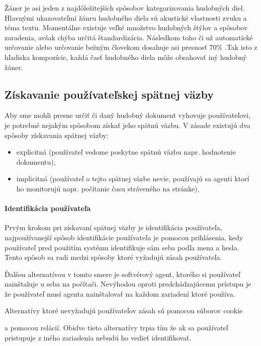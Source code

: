 Žáner je asi jeden z najdôležitejších spôsobov kategorizovania hudobných diel. Hlavnými ukazovateľmi žánru hudobného diela sú akustické vlastnosti zvuku a téma textu. Momentálne existuje veľké množstvo hudobných štýlov a spôsobov zaradenia, avšak chýba určitá štandardizácia. Následkom toho či už automatické určovanie alebo určovanie bežným človekom dosahuje asi presnosť 70\% \cite{5}.Tak isto z hľadiska kompozície, každá časť hudobného diela môže obsahovať iný hudobný žáner\cite{3}.

\subsection{Získavanie používateľskej spätnej väzby}

Aby sme mohli presne určiť či daný hudobný dokument vyhovuje používateľovi, je potrebné nejakým spôsobom získať jeho spätnú väzbu. V zásade existujú dva spôsoby získavania spätnej väzby:

\begin{itemize}
\item{explicitná (používateľ vedome poskytne spätnú väzbu napr. hodnotenie dokumentu),}
\item{implicitná (používateľ o tejto spätnej väzbe nevie, používajú sa agenti ktorí ho monitorujú napr. počítanie času stráveného na stránke),}
\end{itemize}

\paragraph{Identifikácia používateľa}

Prvým krokom pri získavaní spätnej väzby je identifikácia používateľa, najpoužívanejší spôsob identifikácie používateľa je pomocou prihlásenia, kedy používateľ pred použitím systému identifikuje sám seba podľa mena a hesla. Tento spôsob sa radi medzi spôsoby ktoré vyžadujú zásah používateľa. 

Ďalšou alternatívou v tomto smere je softvérový agent, ktorého si používateľ nainštaluje u seba na počítači. Nevýhodou oproti predchádzajúcemu prístupu je že používateľ musí agenta nainštalovať na každom zariadení ktoré používa.

Alternatívy ktoré nevyžadujú používateľov zásah sú pomocou súborov cookie  a pomocou relácií. Obidve tieto alternatívy trpia tím že ak sa používateľ pristupuje z iného zariadenia nebudú ho vedieť identifikovať\cite{4}.

